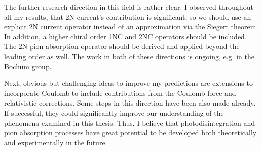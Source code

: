 The further research direction in this field is rather clear. I observed throughout all my results, that
2N current's contribution is significant, so we should use an explicit 2N current operator instead of an approximation 
via the Siegert theorem.
In addition, a higher chiral order 1NC and 2NC operators should be included. The 2N pion absorption operator should be derived and applied beyond the leading order as well.
The work in both of these directions is ongoing, e.g. in the Bochum group.

Next, obvious but challenging ideas to improve my predictions are extensions to incorporate Coulomb to include contributions from the Coulomb force 
and relativistic corrections. Some steps in this direction have been also made already.
If successful, they could significantly improve our understanding of the phenomena examined in this thesis.
Thus, I believe that photodisintegration and pion absorption processes have great potential to be developed both theoretically and experimentally in the future.
